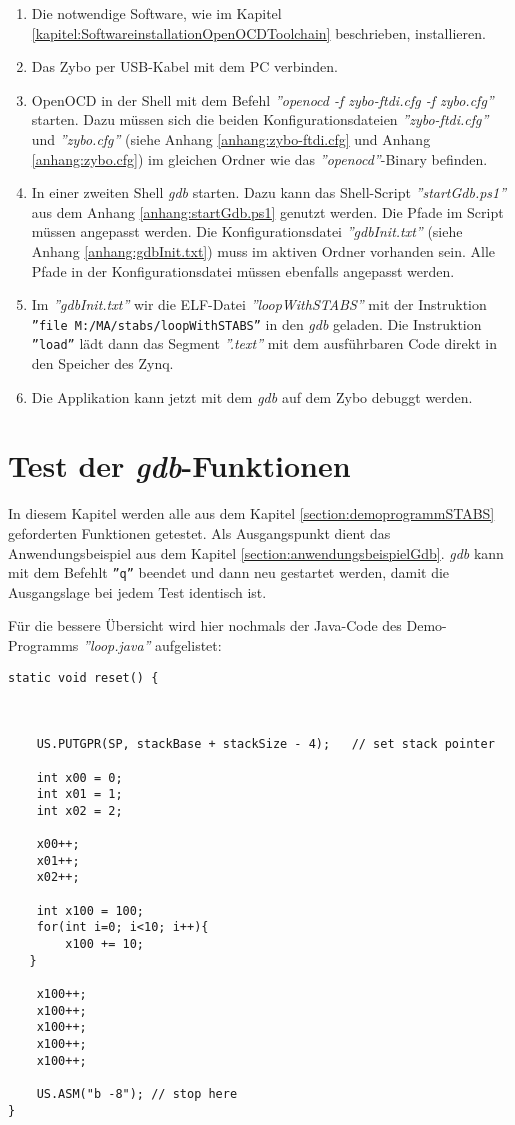 \begin{enumerate}
	\item Die notwendige Software, wie im Kapitel \ref{kapitel:SoftwareinstallationOpenOCDToolchain} beschrieben, installieren.
	\item Das Zybo per USB-Kabel mit dem PC verbinden.
	\item OpenOCD in der Shell mit dem Befehl \textit{''openocd -f zybo-ftdi.cfg -f zybo.cfg''} starten.
	       Dazu müssen sich die beiden Konfigurationsdateien \textit{''zybo-ftdi.cfg''} und \textit{''zybo.cfg''} (siehe Anhang \ref{anhang:zybo-ftdi.cfg} und Anhang \ref{anhang:zybo.cfg}) im gleichen Ordner wie das \textit{''openocd''}-Binary befinden.
	\item In einer zweiten Shell \textit{gdb} starten.
	       Dazu kann das Shell-Script \textit{''startGdb.ps1''} aus dem Anhang \ref{anhang:startGdb.ps1} genutzt werden.
	       Die Pfade im Script müssen angepasst werden.
	       Die Konfigurationsdatei \textit{''gdbInit.txt''} (siehe Anhang \ref{anhang:gdbInit.txt}) muss im aktiven Ordner vorhanden sein.
	       Alle Pfade in der Konfigurationsdatei müssen ebenfalls angepasst werden.
	\item Im \textit{''gdbInit.txt''} wir die ELF-Datei \textit{''loopWithSTABS''} mit der Instruktion \texttt{''file M:/MA/stabs/loopWithSTABS''} in den \textit{gdb} geladen. Die Instruktion \texttt{''load''} lädt dann das Segment \textit{''.text''} mit dem ausführbaren Code direkt in den Speicher des Zynq.
	\item Die Applikation kann jetzt mit dem \textit{gdb} auf dem Zybo debuggt werden.
\end{enumerate}


\section{Test der \textit{gdb}-Funktionen}
In diesem Kapitel werden alle aus dem Kapitel \ref{section:demoprogrammSTABS} geforderten Funktionen getestet.
Als Ausgangspunkt dient das Anwendungsbeispiel aus dem Kapitel \ref{section:anwendungsbeispielGdb}.
\textit{gdb} kann mit dem Befehlt \texttt{''q''} beendet und dann neu gestartet werden, damit die Ausgangslage bei jedem Test identisch ist.


Für die bessere Übersicht wird hier nochmals der Java-Code des Demo-Programms \textit{''loop.java''} aufgelistet:
\lstset{language=java}
\begin{lstlisting}
static void reset() {



	US.PUTGPR(SP, stackBase + stackSize - 4);	// set stack pointer
	
	int x00 = 0;
	int x01 = 1;
	int x02 = 2;
	
	x00++;
	x01++;
	x02++;
	
	int x100 = 100;
	for(int i=0; i<10; i++){
		x100 += 10;
   }
		
	x100++;
	x100++;
	x100++;
	x100++;
	x100++;

	US.ASM("b -8"); // stop here
}
\end{lstlisting}


